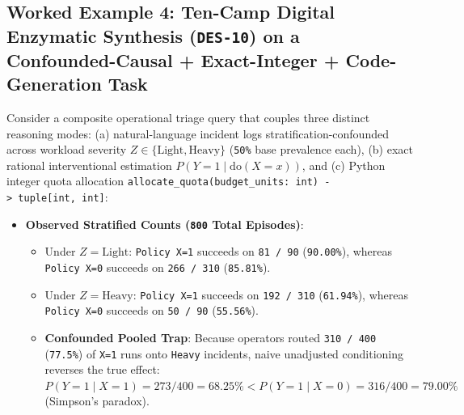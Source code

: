 \documentclass[10pt,letterpaper]{article}
\providecommand{\tightlist}{\setlength{\itemsep}{1pt}\setlength{\parskip}{0pt}}
\begin{document}
\subsection{\texorpdfstring{Worked Example 4: Ten-Camp Digital Enzymatic
Synthesis (\texttt{DES-10}) on a Confounded-Causal + Exact-Integer +
Code-Generation
Task}{Worked Example 4: Ten-Camp Digital Enzymatic Synthesis (DES-10) on a Confounded-Causal + Exact-Integer + Code-Generation Task}}\label{worked-example-4-ten-camp-digital-enzymatic-synthesis-des-10-on-a-confounded-causal-exact-integer-code-generation-task}

Consider a composite operational triage query that couples three
distinct reasoning modes: (a) natural-language incident logs
stratification-confounded across workload severity
\(Z \in \{\text{Light}, \text{Heavy}\}\) (\texttt{50\%} base prevalence
each), (b) exact rational interventional estimation
\(P(Y=1 \mid \mathrm{do}(X=x))\), and (c) Python integer quota
allocation
\texttt{allocate\_quota(budget\_units:\ int)\ -\textgreater{}\ tuple{[}int,\ int{]}}:

\begin{itemize}
\tightlist
\item
  \textbf{Observed Stratified Counts (\texttt{800} Total Episodes)}:

  \begin{itemize}
  \tightlist
  \item
    Under \(Z = \text{Light}\): \texttt{Policy\ X=1} succeeds on
    \texttt{81\ /\ 90} (\texttt{90.00\%}), whereas \texttt{Policy\ X=0}
    succeeds on \texttt{266\ /\allowbreak{}\ 310} (\texttt{85.81\%}).
  \item
    Under \(Z = \text{Heavy}\): \texttt{Policy\ X=1} succeeds on
    \texttt{192\ /\allowbreak{}\ 310} (\texttt{61.94\%}), whereas
    \texttt{Policy\ X=0} succeeds on \texttt{50\ /\ 90}
    (\texttt{55.56\%}).
  \item
    \textbf{Confounded Pooled Trap}: Because operators routed
    \texttt{310\ /\allowbreak{}\ 400} (\texttt{77.5\%}) of \texttt{X=1} runs onto
    \texttt{Heavy} incidents, naive unadjusted conditioning reverses the
    true effect:
    \(P(Y=1 \mid X=1) = 273 / 400 = 68.25\% < P(Y=1 \mid X=0) = 316 / 400 = 79.00\%\)
    (Simpson's paradox).
  \end{itemize}
\end{itemize}
\end{document}
